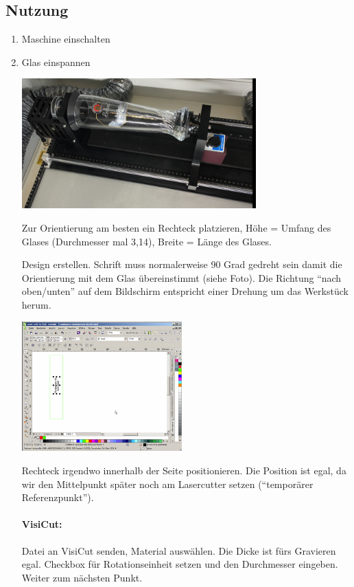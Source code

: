 \documentclass{\basedir/fablab-document}
\begin{document}
	\subsection{Nutzung}
	\begin{enumerate}
		\item Maschine einschalten

		\item Glas einspannen

		{\includegraphics[height=5cm]{img/rotationseinheit/38358ef6ae653ec2e9c5f955a59b064e9fc93d55.png}}


		Zur Orientierung am besten ein Rechteck platzieren, Höhe = Umfang des Glases (Durchmesser mal 3,14), Breite = Länge des Glases.

		Design erstellen. Schrift muss normalerweise 90 Grad gedreht sein damit die Orientierung mit dem Glas übereinstimmt (siehe Foto). Die Richtung \enquote{nach oben/unten} auf dem Bildschirm entspricht einer Drehung um das Werkstück herum.

		{\includegraphics[height=5cm]{img/rotationseinheit/2ddfed951537c92f612bb310068bfb1863091218.png}}


		Rechteck irgendwo innerhalb der Seite positionieren. Die Position ist egal, da wir den Mittelpunkt später noch am Lasercutter setzen (\enquote{temporärer Referenzpunkt}).

		\paragraph{VisiCut:} Datei an VisiCut senden, Material auswählen. Die Dicke ist fürs Gravieren egal. Checkbox für Rotationseinheit setzen und den Durchmesser eingeben. Weiter zum nächsten Punkt.


\end{enumerate}
\end{document}
